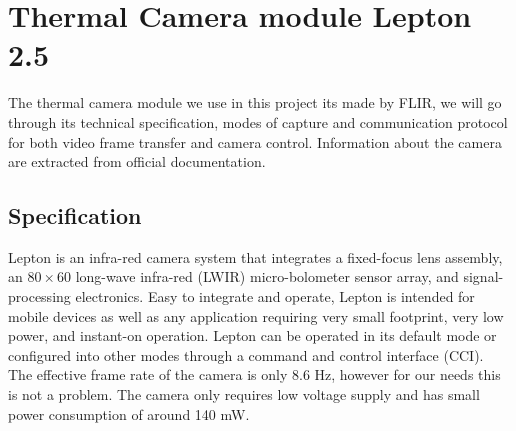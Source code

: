 \section{Thermal Camera module Lepton 2.5}
\label{sec:thermalcamera}
The thermal camera module we use in this project its made by FLIR, we will go
through its technical specification, modes of capture and communication protocol
for both video frame transfer and camera control. Information about the camera
are extracted from official documentation.
%
\subsection{Specification}
\label{ssec:specificationthermalcam}
Lepton is an infra-red camera system that integrates a fixed-focus lens assembly,
an $80 \times 60$ long-wave infra-red (LWIR) micro-bolometer sensor array, and
signal-processing electronics. Easy to integrate and operate, Lepton is intended
for mobile devices as well as any application requiring very small
footprint, very low power, and instant-on operation. Lepton can be operated in
its default mode or configured into other modes through a command and control
interface (CCI). The effective frame rate of the camera is only 8.6 \si{\hertz},
however for our needs this is not a problem. 
The camera only requires low voltage supply and has small power consumption of 
around 140 \si{\milli\watt}.
\begin{figure}[!htb]
    \centering
     \quad
    \label{fig:camerarender}
\end{figure}
%

